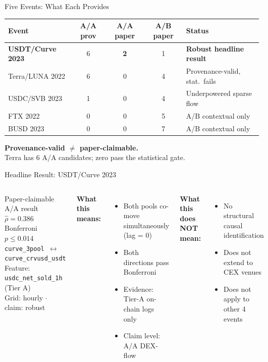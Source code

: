 \documentclass[aspectratio=169,11pt]{beamer}
\begin{document}
\begin{frame}{Five Events: What Each Provides}
\centering
\small
\begin{tabular}{lcccl}
\toprule
Event & A/A prov & A/A paper & A/B paper & Status \\
\midrule
\textbf{USDT/Curve 2023} & 6 & \textbf{\textcolor{cugreen}{2}} & 1 & \textcolor{cugreen}{\textbf{Robust headline result}} \\
Terra/LUNA 2022 & 6 & \textcolor{cured}{0} & 4 & Provenance-valid, stat.\ fails \\
USDC/SVB 2023   & 1 & \textcolor{cured}{0} & 4 & Underpowered sparse flow \\
FTX 2022        & 0 & 0 & 5 & A/B contextual only \\
BUSD 2023       & 0 & 0 & 7 & A/B contextual only \\
\bottomrule
\end{tabular}
\vspace{10pt}
\textbf{Provenance-valid $\neq$ paper-claimable.}\\[4pt]
Terra has 6 A/A candidates; zero pass the statistical gate.
\end{frame}


\begin{frame}{Headline Result: USDT/Curve 2023}
\begin{columns}[T]
\begin{block}{Paper-claimable A/A result}
\centering
\vspace{4pt}
{\LARGE\bfseries\color{cuamber} $\hat{\rho} = 0.386$}\\[6pt]
{\large Bonferroni $p \le 0.014$}\\[6pt]
\texttt{curve\_3pool $\leftrightarrow$ curve\_crvusd\_usdt}\\[4pt]
Feature: \texttt{usdc\_net\_sold\_1h} (Tier A)\\
Grid: hourly $\cdot$ claim: robust
\end{block}
\textbf{What this means:}
\begin{itemize}
  \item Both pools co-move simultaneously (lag = 0)
  \item Both directions pass Bonferroni
  \item Evidence: Tier-A on-chain logs only
  \item Claim level: A/A DEX-flow
\end{itemize}
\vspace{6pt}
\textbf{\color{cured}What this does NOT mean:}
\begin{itemize}
  \item No structural causal identification
  \item Does not extend to CEX venues
  \item Does not apply to other 4 events
\end{itemize}
\end{columns}
\end{frame}
\end{document}
